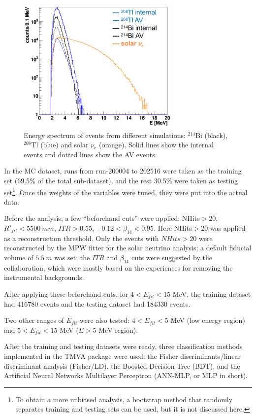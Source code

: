 \begin{figure}[!htb]
	\centering
	\includegraphics[width=8cm]{TMVA_bkgs_1.png}
	\caption[Energy spectrum of events from different simulations.]{Energy spectrum of events from different simulations: $^{214}$Bi (black), $^{208}$Tl (blue) and solar $\nu_e$ (orange). Solid lines show the internal events and dotted lines show the AV events.}
	\label{TMVA_bkgs_1}
\end{figure}

In the MC dataset, runs from run-200004 to 202516 were taken as the training set (69.5\% of the total sub-dataset), and the rest 30.5\% were taken as testing set\footnote{To obtain a more unbiased analysis, a bootstrap method\cite{murphy2012machine} that randomly separates training and testing sets can be used, but it is not discussed here.}. Once the weights of the variables were tuned, they were put into the actual data.

Before the analysis, a few ``beforehand cuts'' were applied: NHits$>20$, $R'_{fit}<5500~mm$, $ITR>0.55$, $-0.12<\beta_{14}<0.95$. Here NHits$>20$ was applied as a reconstruction threshold. Only the events with $NHits>20$ were reconstructed by the MPW fitter for the solar neutrino analysis; a default fiducial volume of $5.5~m$ was set; the $ITR$ and $\beta_{14}$ cuts were suggested by the collaboration, which were mostly based on the experiences for removing the instrumental backgrounds\cite{waterunidoc}. 

After applying these beforehand cuts, for $4<E_{fit}<15$ MeV, the training dataset had 416780 events and the testing dataset had 184330 events.

Two other ranges of $E_{fit}$ were also tested: $4<E_{fit}<5$ MeV (low energy region) and $5<E_{fit}<15$ MeV ($E>5$ MeV region). %

After the training and testing datasets were ready, three classification methods implemented in the TMVA package were used: the Fisher discriminants/linear discriminant analysis (Fisher/LD), the Boosted Decision Tree (BDT), and the Artificial Neural Networks Multilayer Perceptron (ANN-MLP, or MLP in short)\cite{albertsson2007tmva}.

